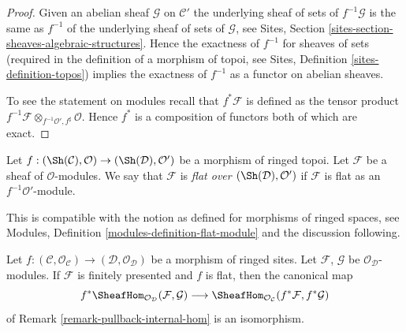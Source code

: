 \begin{proof}
Given an abelian sheaf $\mathcal{G}$ on $\mathcal{C}'$
the underlying sheaf of sets of $f^{-1}\mathcal{G}$ is the same
as $f^{-1}$ of the underlying sheaf of sets of $\mathcal{G}$, see
Sites, Section \ref{sites-section-sheaves-algebraic-structures}.
Hence the exactness of $f^{-1}$ for sheaves of sets (required in the
definition of a morphism of topoi, see
Sites, Definition \ref{sites-definition-topos})
implies the exactness of $f^{-1}$ as a functor on abelian sheaves.

\medskip\noindent
To see the statement on modules recall that $f^*\mathcal{F}$ is defined
as the tensor product
$f^{-1}\mathcal{F} \otimes_{f^{-1}\mathcal{O}', f^\sharp} \mathcal{O}$.
Hence $f^*$ is a composition of functors both of which are exact.
\end{proof}

\begin{definition}
\label{definition-flat-module}
Let $f : (\Sh(\mathcal{C}), \mathcal{O}) \to (\Sh(\mathcal{D}), \mathcal{O}')$
be a morphism of ringed topoi. Let $\mathcal{F}$ be a sheaf of
$\mathcal{O}$-modules. We say that $\mathcal{F}$ is
{\it flat over $(\Sh(\mathcal{D}), \mathcal{O}')$} if
$\mathcal{F}$ is flat as an $f^{-1}\mathcal{O}'$-module.
\end{definition}

\noindent
This is compatible with the notion as defined for morphisms of ringed spaces,
see Modules, Definition \ref{modules-definition-flat-module}
and the discussion following.

\begin{lemma}
\label{lemma-pullback-internal-hom}
Let $f : (\mathcal{C}, \mathcal{O}_\mathcal{C}) \to
(\mathcal{D}, \mathcal{O}_\mathcal{D})$ be a morphism
of ringed sites. Let $\mathcal{F}$, $\mathcal{G}$ be
$\mathcal{O}_\mathcal{D}$-modules.
If $\mathcal{F}$ is finitely presented and $f$ is flat,
then the canonical map
$$
f^*\SheafHom_{\mathcal{O}_\mathcal{D}}(\mathcal{F}, \mathcal{G})
\longrightarrow
\SheafHom_{\mathcal{O}_\mathcal{C}}(f^*\mathcal{F}, f^*\mathcal{G})
$$
of Remark \ref{remark-pullback-internal-hom} is an isomorphism.
\end{lemma}


